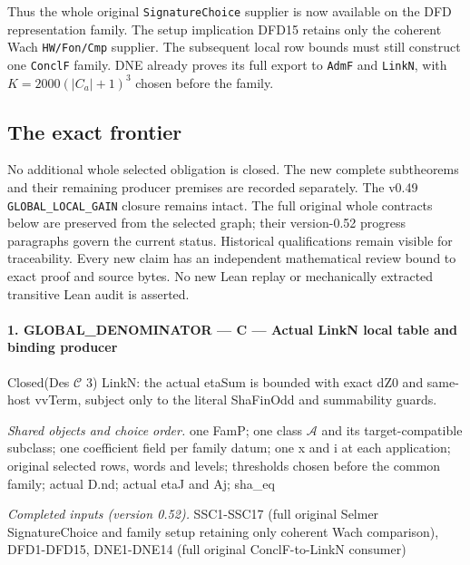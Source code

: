 \documentclass[11pt,a4paper]{article}
\numberwithin{equation}{section}
\theoremstyle{remark}\newtheorem{remark}[theorem]{Remark}
\begin{document}
Thus the whole original \texttt{Signature\allowbreak Choice} supplier is now
available on the DFD representation family. The setup implication
DFD15 retains only the coherent Wach \texttt{HW/\allowbreak Fon/\allowbreak Cmp} supplier.
The subsequent local row bounds must still construct one
\texttt{Concl\allowbreak F} family. DNE already proves its full export to
\texttt{Adm\allowbreak F} and \texttt{Link\allowbreak N}, with
$K=2000(|C_a|+1)^3$ chosen before the family.

\subsection{The exact frontier}

No additional whole selected obligation is closed. The new complete
subtheorems and their remaining producer premises are recorded
separately. The v0.49 \texttt{GLOBAL\_\allowbreak LOCAL\_\allowbreak GAIN} closure
remains intact. The full original whole contracts below are preserved
from the selected graph; their version-0.52 progress paragraphs
govern the current status. Historical qualifications remain visible
for traceability. Every new claim has an independent mathematical
review bound to exact proof and source bytes. No new Lean replay
or mechanically extracted transitive Lean audit is asserted.
\paragraph{1. GLOBAL\_\allowbreak DENOMINATOR — C — Actual LinkN local table and binding producer}

Closed(Des $\mathcal C$ 3) LinkN: the actual etaSum is bounded with exact dZ0 and same-host vvTerm, subject only to the literal ShaFinOdd and summability guards.

\emph{Shared objects and choice order.} one FamP; one class $\mathcal A$ and its target-compatible subclass; one coefficient field per family datum; one x and i at each application; original selected rows, words and levels; thresholds chosen before the common family; actual D.nd; actual etaJ and Aj; sha\_\allowbreak eq

\emph{Completed inputs (version 0.52).} SSC1-SSC17 (full original Selmer SignatureChoice and family setup retaining only coherent Wach comparison), DFD1-DFD15, DNE1-DNE14 (full original ConclF-to-LinkN consumer)
\end{document}
